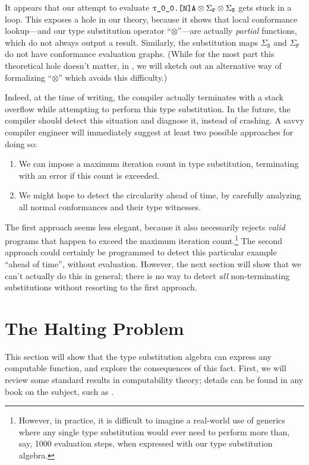 \documentclass[../generics]{subfiles}
\begin{document}
It appears that our attempt to evaluate $\texttt{\ttgp{0}{0}.[N]A}\otimes \Sigma_\texttt{F}\otimes\Sigma_\texttt{S}$ gets stuck in a loop. This exposes a hole in our theory, because it shows that local conformance lookup---and our type substitution operator ``$\otimes$''---are actually \emph{partial} functions, which do not always output a result. Similarly, the substitution maps $\Sigma_\texttt{S}$ and $\Sigma_\texttt{F}$ do not have conformance evaluation graphs. (While for the most part this theoretical hole doesn't matter, in , we will sketch out an alternative way of formalizing ``$\otimes$'' which avoids this difficulty.)

Indeed, at the time of writing, the compiler actually terminates with a stack overflow while attempting to perform this type substitution. In the future, the compiler should detect this situation and diagnose it, instead of crashing. A savvy compiler engineer will immediately suggest at least two possible approaches for doing so:
\begin{enumerate}
\item We can impose a maximum iteration count in type substitution, terminating with an error if this count is exceeded.
\item We might hope to detect the circularity ahead of time, by carefully analyzing all normal conformances and their type witnesses.
\end{enumerate}
The first approach seems less elegant, because it also necessarily rejects \emph{valid} programs that happen to exceed the maximum iteration count.\footnote{However, in practice, it is difficult to imagine a real-world use of generics where any single type substitution would ever need to perform more than, say, 1000 evaluation steps, when expressed with our type substitution algebra.} The second approach could certainly be programmed to detect this particular example ``ahead of time'', without evaluation. However, the next section will show that we can't actually do this in general; there is no way to detect \emph{all} non-terminating substitutions without resorting to the first approach.

\section{The Halting Problem}\label{tag systems}

This section will show that the type substitution algebra can express any computable function, and explore the consequences of this fact. First, we will review some standard results in computability theory; details can be found in any book on the subject, such as \cite{cutland}.
\end{document}
